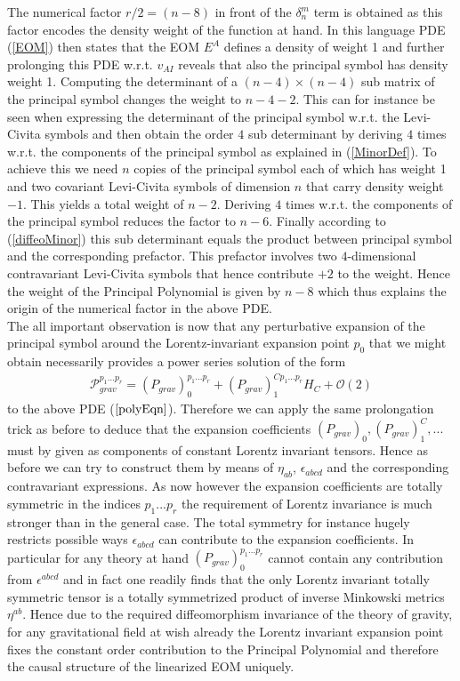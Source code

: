 \documentclass[a4paper,12pt, DIV=14, BCOR=5mm, twoside, headsepline, numbers=noenddot]{scrbook}
\begin{document}
The numerical factor $r/2 = (n-8)$ in front of the $\delta^m_n$ term is obtained as this factor encodes the density weight of the function at hand. In this language PDE (\ref{EOM}) then states that the EOM $E^A$ defines a density of weight 1 and further prolonging this PDE w.r.t. $v_{AI}$ reveals that also the principal symbol has density weight 1. Computing the determinant of a $(n-4) \times (n-4)$ sub matrix of the principal symbol changes the weight to $n-4-2$. This can for instance be seen when expressing the determinant of the principal symbol w.r.t. the Levi-Civita symbols and then obtain the order $4$ sub determinant by deriving $4$ times w.r.t. the components of the principal symbol as explained in (\ref{MinorDef}). To achieve this  we need $n$ copies of the principal symbol each of which has weight 1 and two covariant Levi-Civita symbols of dimension $n$ that carry density weight $-1$. This yields a total weight of $n-2$. Deriving $4$ times w.r.t. the components of the principal symbol reduces the factor to $n-6$. Finally according to (\ref{diffeoMinor}) this sub determinant equals the product between principal symbol and the corresponding prefactor. This prefactor involves two $4$-dimensional contravariant Levi-Civita symbols that hence contribute $+2$ to the weight. Hence the weight of the Principal Polynomial is given by $n-8$ which thus explains the origin of the numerical factor in the above PDE. \\ 

The all important observation is now that any perturbative expansion of the principal symbol around the Lorentz-invariant expansion point $p_0$ that we might obtain necessarily provides a power series solution of the form
\begin{align}
    \mathcal{P}_{grav}^{{p_1}...{p_{r}}} = (P_{grav})^{{p_1}...{p_{r}}}_0 + (P_{grav})_1^{C{p_1}...{p_{r}}} H_C + \mathcal{O}(2)
\end{align}
to the above PDE ($\ref{polyEqn}$). Therefore we can apply the same prolongation trick as before to deduce that the expansion coefficients $(P_{grav})_0, (P_{grav})_1^C,...$ must by given as components of constant Lorentz invariant tensors. Hence as before we can try to construct them by means of $\eta_{ab}$, $\epsilon_{abcd}$ and the corresponding contravariant expressions. As now however the expansion coefficients are totally symmetric in the indices $p_1...p_r$ the requirement of Lorentz invariance is much stronger than in the general case. The total symmetry for instance hugely restricts possible ways $\epsilon_{abcd}$ can contribute to the expansion coefficients. In particular for any theory at hand $(P_{grav})_0^{{p_1}...{p_{r}}}$ cannot contain any contribution from $\epsilon^{abcd}$ and in fact one readily finds that the only Lorentz invariant totally symmetric tensor is a totally symmetrized product of inverse Minkowski metrics $\eta^{ab}$. Hence due to the required diffeomorphism invariance of the theory of gravity, for any gravitational field at wish already the Lorentz invariant expansion point fixes the constant order contribution to the Principal Polynomial and therefore the causal structure of the linearized EOM uniquely.\\
\end{document}
